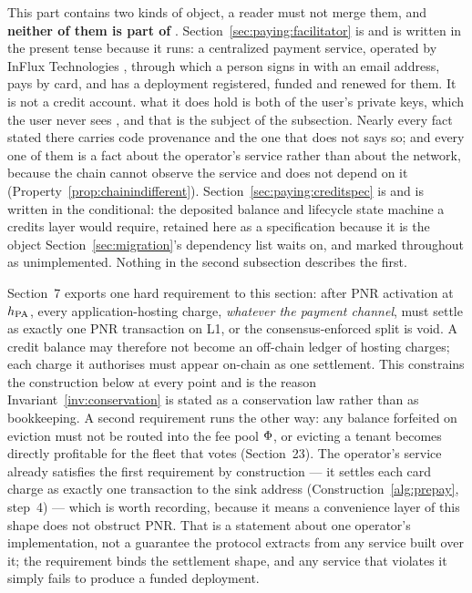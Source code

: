 This part contains two kinds of object, a reader must not merge them, and \textbf{neither of them is
part of \Flux}. Section~\ref{sec:paying:facilitator} is \shipped and is written in the present tense
because it runs: a centralized payment service, operated by InFlux Technologies
, through which a person signs in with an email address,
pays by card, and has a deployment registered, funded and renewed for them. It is not a credit
account.  what it does hold is both of the user's private keys, which the user never sees
, and that is the subject of the subsection. Nearly every
fact stated there carries code provenance and the one that does not says so; and every one of them is
a fact about the operator's service rather than about the network, because the chain cannot observe
the service and does not depend on it (Property~\ref{prop:chainindifferent}). Section~\ref{sec:paying:creditspec} is \planned and is
written in the conditional: the deposited balance and lifecycle state machine a credits layer would
require, retained here as a specification because it is the object Section~\ref{sec:migration}'s dependency list waits
on, and marked throughout as unimplemented. Nothing in the second subsection describes the first.

\begin{remark}
\label{req:pnr}
Section~7 exports one hard requirement to this section: after PNR activation at $h_{\mathrm{PA}}$, every
application-hosting charge, \emph{whatever the payment channel}, must settle as exactly one PNR
transaction on L1, or the consensus-enforced split is void. A credit balance may therefore not become
an off-chain ledger of hosting charges; each charge it authorises must appear on-chain as one
settlement. This constrains the construction below at every point and is the reason
Invariant~\ref{inv:conservation} is stated as a conservation law rather than as bookkeeping. A second
requirement runs the other way: any balance forfeited on eviction must not be routed into the fee
pool $\Phi$, or evicting a tenant becomes directly profitable for the fleet that votes (Section~23).
The operator's service already satisfies the first requirement by construction --- it settles each
card charge as exactly one transaction to the sink address (Construction~\ref{alg:prepay}, step~4)
--- which is worth recording, because it means a convenience layer of this shape does not obstruct
PNR. That is a statement about one operator's implementation, not a guarantee the protocol extracts
from any service built over it; the requirement binds the settlement shape, and any service that
violates it simply fails to produce a funded deployment.
\end{remark}

